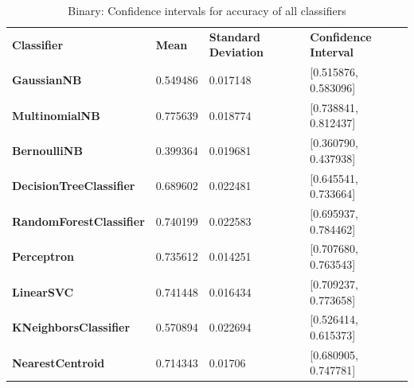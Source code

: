 \documentclass{article}
\begin{document}
\begin{table}[H]
\begin{tabular}{llll}
\textbf{Classifier}             & \textbf{Mean} & \textbf{Standard Deviation} & \textbf{Confidence Interval} \\
\textbf{GaussianNB}             & 0.549486      & 0.017148                    & {[}0.515876, 0.583096{]}     \\
\textbf{MultinomialNB}          & 0.775639      & 0.018774                    & {[}0.738841, 0.812437{]}     \\
\textbf{BernoulliNB}            & 0.399364      & 0.019681                    & {[}0.360790, 0.437938{]}     \\
\textbf{DecisionTreeClassifier} & 0.689602      & 0.022481                    & {[}0.645541, 0.733664{]}     \\
\textbf{RandomForestClassifier} & 0.740199      & 0.022583                    & {[}0.695937, 0.784462{]}     \\
\textbf{Perceptron}             & 0.735612      & 0.014251                    & {[}0.707680, 0.763543{]}     \\
\textbf{LinearSVC}              & 0.741448      & 0.016434                    & {[}0.709237, 0.773658{]}     \\
\textbf{KNeighborsClassifier}   & 0.570894      & 0.022694                    & {[}0.526414, 0.615373{]}     \\
\textbf{NearestCentroid}        & 0.714343      & 0.01706                     & {[}0.680905, 0.747781{]}    
\end{tabular}
\caption {Binary: Confidence intervals for accuracy of all classifiers}
\end{table}

\clearpage
\end{document}
